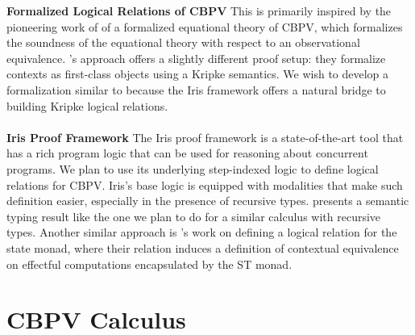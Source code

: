 \documentclass[11pt,twoside]{article}
\begin{document}
\textbf{Formalized Logical Relations of CBPV}
This is primarily inspired by the pioneering work of \citet{rizkallah} of a formalized equational theory of CBPV, which formalizes the soundness of the equational theory with respect to an observational equivalence.
\citet{forster}'s approach offers a slightly different proof setup: they formalize contexts as first-class objects using a Kripke semantics.
We wish to develop a formalization similar to \citet{forster} because the Iris framework offers a natural bridge to building Kripke logical relations.\\
\\
\textbf{Iris Proof Framework}
The Iris proof framework is a state-of-the-art tool that has a rich program logic that can be used for reasoning about concurrent programs.
We plan to use its underlying step-indexed logic to define logical relations for CBPV.
Iris's base logic is equipped with modalities that make such definition easier, especially in the presence of recursive types.
\citet{krebbers2017} presents a semantic typing result like the one we plan to do for a similar calculus with recursive types.
Another similar approach is \citet{timany}'s work on defining a logical relation for the state monad, where their relation induces a definition of contextual equivalence on effectful computations encapsulated by the ST monad.

\section{CBPV Calculus}


\newcommand{\sep}{\;|\;}
\end{document}
